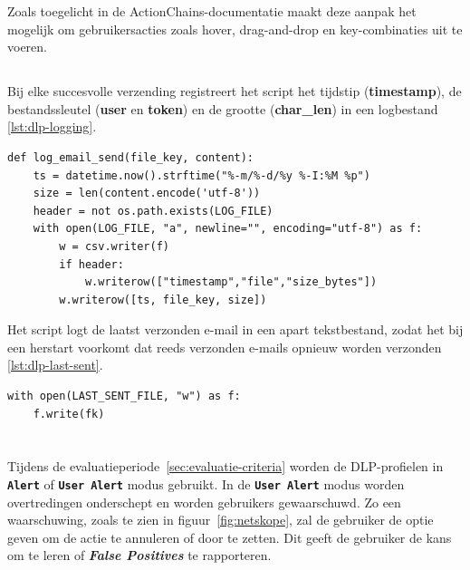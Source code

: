 Zoals toegelicht in de \textcite{Selenium2025ActionChains} ActionChains-documentatie maakt deze aanpak het mogelijk om gebruikersacties zoals hover, drag-and-drop en key-combinaties uit te voeren.

\subsection{}
\label{subsubsec:logging-herstartbaarheid}

Bij elke succesvolle verzending registreert het script het tijdstip (\textbf{timestamp}), 
de bestandssleutel (\textbf{user} en \textbf{token}) en de grootte (\textbf{char\_len}) in een logbestand \ref{lst:dlp-logging}.

\begin{lstlisting}[style=custompython,label={lst:dlp-logging}, caption={Logging van verzonden e-mails}, captionpos=b]
def log_email_send(file_key, content):
    ts = datetime.now().strftime("%-m/%-d/%y %-I:%M %p")
    size = len(content.encode('utf-8'))
    header = not os.path.exists(LOG_FILE)
    with open(LOG_FILE, "a", newline="", encoding="utf-8") as f:
        w = csv.writer(f)
        if header:
            w.writerow(["timestamp","file","size_bytes"])
        w.writerow([ts, file_key, size])
\end{lstlisting}

Het script logt de laatst verzonden e-mail in een apart tekstbestand, zodat het bij een herstart voorkomt dat reeds verzonden e-mails opnieuw worden verzonden \ref{lst:dlp-last-sent}.

\begin{lstlisting}[style=custompython,label={lst:dlp-last-sent}, caption={Logging van laatst verzonden bericht}, captionpos=b]
with open(LAST_SENT_FILE, "w") as f:
    f.write(fk)
\end{lstlisting}

\section{}
\label{subsubsec:netskope-alerts}

Tijdens de evaluatieperiode~\ref{sec:evaluatie-criteria} worden de DLP-profielen in \textbf{\texttt{Alert}} of \textbf{\texttt{User Alert}} modus gebruikt.
In de \textbf{\texttt{User Alert}} modus worden overtredingen onderschept en worden gebruikers gewaarschuwd.
Zo een waarschuwing, zoals te zien in figuur~\ref{fig:netskope}, zal de gebruiker de optie geven om de actie te annuleren of door te zetten.
Dit geeft de gebruiker de kans om te leren of \textit{\textbf{False Positives}} te rapporteren.


